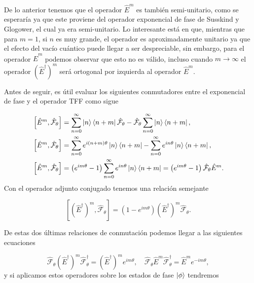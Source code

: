         De lo anterior tenemos que el operador $\hat{E}^m$ es también semi-unitario, como se esperaría ya que este proviene del operador exponencial de fase de Susskind y Glogower, el cual ya era semi-unitario. Lo interesante está en que, mientras que para $m=1$, si $n$ es muy grande, el operador es aproximadamente unitario ya que el efecto del vacío cuántico puede llegar a ser despreciable, sin embargo, para el operador $\hat{E}^m$ podemos observar que esto no es válido, incluso cuando $m \to \infty$ el operador $\left( \hat{E}^\dagger \right)^m$ será ortogonal por izquierda al operador $\hat{E}^m$.

        Antes de seguir, es útil evaluar los siguientes conmutadores entre el exponencial de fase y el operador TFF como sigue

        \begin{align}
            & \left[ \hat{E}^m, \hat{\mathcal{F}}_\theta \right] = \sum_{n=0}^\infty \ket{n}\bra{n+m}\hat{\mathcal{F}}_\theta - \hat{\mathcal{F}}_\theta \sum_{n=0}^\infty \ket{n}\bra{n+m},\\
            & \left[ \hat{E}^m, \hat{\mathcal{F}}_\theta \right] = \sum_{n=0}^{\infty} e^{i(n+m)\theta}\ket{n}\bra{n+m} - \sum_{n=0}^{\infty} e^{in\theta} \ket{n}\bra{n+m},\\
            & \left[ \hat{E}^m, \hat{\mathcal{F}}_\theta \right] = \left( e^{im\theta} -1 \right)\sum_{n=0}^\infty e^{in\theta}\ket{n}\bra{n+m} = \left( e^{im\theta}-1 \right)\hat{\mathcal{F}}_\theta\hat{E}^m.
        \end{align}
        Con el operador adjunto conjugado tenemos una relación semejante

        \begin{equation}
            \left[ \left( \hat{E}^\dagger \right)^m, \hat{\mathcal{F}}_\theta \right] = \left( 1-e^{im\theta} \right)\left( \hat{E}^\dagger \right)^m \hat{\mathcal{F}}_\theta.
        \end{equation}

        De estas dos últimas relaciones de conmutación podemos llegar a las siguientes ecuaciones

        \begin{equation}
            \hat{\mathcal{F}}_\theta \left( \hat{E}^\dagger \right)^m \hat{\mathcal{F}}_\theta^\dagger = \left( \hat{E}^\dagger \right)^me^{im\theta}, \quad \hat{\mathcal{F}}_\theta \hat{E}^m \hat{\mathcal{F}}^\dagger_\theta = \hat{E}^m e^{-im\theta},
        \end{equation}
        y si aplicamos estos operadores sobre los estados de fase $\ket{\phi}$ tendremos


